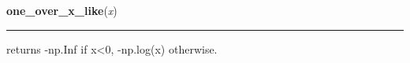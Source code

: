 \hspace{.8\funcindent}\begin{boxedminipage}{\funcwidth}

    \raggedright \textbf{one\_over\_x\_like}(\textit{x})

    \vspace{-1.5ex}

    \rule{\textwidth}{1pt}
\setlength{\parskip}{2ex}

returns -np.Inf if x{\textless}0, -np.log(x) otherwise.
\setlength{\parskip}{1ex}
    \end{boxedminipage}

    \label{pymc:distributions:poisson_like}

    \vspace{0.5ex}

